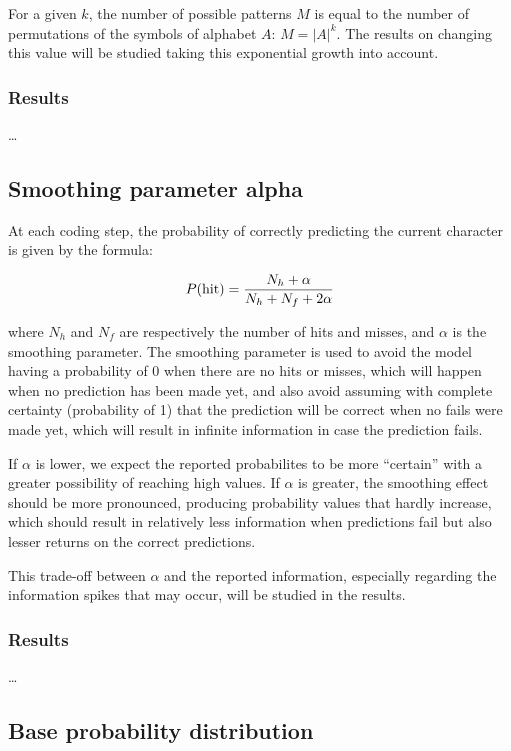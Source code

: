 \documentclass{article}
\begin{document}
For a given $k$, the number of possible patterns $M$ is equal to the number of permutations of the symbols of alphabet $A$: $M = \vert A \vert ^ k$.
The results on changing this value will be studied taking this exponential growth into account.

\subsubsection{Results}

\dots

\subsection{Smoothing parameter alpha}

At each coding step, the probability of correctly predicting the current character is given by the formula:

$$
P(\textnormal{hit}) = \frac{N_h + \alpha}{N_h + N_f + 2\alpha}
$$

where $N_h$ and $N_f$ are respectively the number of hits and misses, and $\alpha$ is the smoothing parameter.
The smoothing parameter is used to avoid the model having a probability of 0 when there are no hits or misses, which will happen when no prediction has been made yet, and also avoid assuming with complete certainty (probability of 1) that the prediction will be correct when no fails were made yet, which will result in infinite information in case the prediction fails.

If $\alpha$ is lower, we expect the reported probabilites to be more ``certain'' with a greater possibility of reaching high values.
If $\alpha$ is greater, the smoothing effect should be more pronounced, producing probability values that hardly increase, which should result in relatively less information when predictions fail but also lesser returns on the correct predictions.

This trade-off between $\alpha$ and the reported information, especially regarding the information spikes that may occur, will be studied in the results.

\subsubsection{Results}

\dots

\subsection{Base probability distribution}
\end{document}
